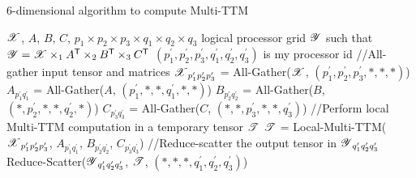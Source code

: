 \documentclass[aspectratio=169]{beamer}
\newcommand{\X}{\T{X}}
\newcommand{\Y}{\T{Y}}
\begin{document}
\begin{frame}{6-dimensional algorithm to compute Multi-TTM}
	\vspace*{-0.35cm}\begin{algorithm}[H]
		\caption{3-dimensional Parallel Atomic Multi-TTM}
		\begin{algorithmic}[1]
			\REQUIRE $\T{X}$, $A$, $B$, $C$, $p_1 \times p_2 \times p_3 \times q_1 \times q_2 \times q_3$ logical processor grid
			\ENSURE $\T{Y}$ such that $\Y = \X \times_1 {A}^\Tra \times_2 {B}^\Tra \times_3 {C}^\Tra$
			\STATE $(p_1^\prime, p_2^\prime, p_3^\prime, q_1^\prime, q_2^\prime, q_3^\prime)$ is my processor id
			\STATE //All-gather input tensor and matrices
			\STATE $\T{X}_{p_1^\prime p_2^\prime p_3^\prime}$ = All-Gather($\T{X}$, $(p_1^\prime, p_2^\prime, p_3^\prime, *, *, *)$)\label{alg:3dmultittm:line:allGatherInputTensor}
			\STATE $A_{p_1^\prime q_1^\prime}$ = All-Gather($A$, $(p_1^\prime, *, *, q_1^\prime, *, *)$)\label{alg:3dmultittm:line:allGatherMatrix1}
			\STATE $B_{p_2^\prime q_2^\prime}$ = All-Gather($B$, $(*, p_2^\prime, *, *, q_2^\prime, *)$)\label{alg:3dmultittm:line:allGatherMatrix2}
			\STATE $C_{p_3^\prime q_3^\prime}$ = All-Gather($C$, $(*, *, p_3^\prime, *, *, q_3^\prime)$)
			\STATE //Perform local Multi-TTM computation in a temporary tensor $\T{T}$
			\STATE $\T{T}$ = Local-Multi-TTM($\T{X}_{p_1^\prime p_2^\prime p_3^\prime}$, $A_{p_1^\prime q_1^\prime}$, $B_{p_2^\prime q_2^\prime}$, $C_{p_3^\prime q_3^\prime}$)
			\STATE //Reduce-scatter the output tensor in $\T{Y}_{q_1^\prime q_2^\prime q_3^\prime}$
			\STATE Reduce-Scatter($\T{Y}_{q_1^\prime q_2^\prime q_3^\prime}$, $\T{T}$, $(*, *, *, q_1^\prime, q_2^\prime, q_3^\prime)$)
		\end{algorithmic}
	\end{algorithm}
\end{frame}




\end{document}
